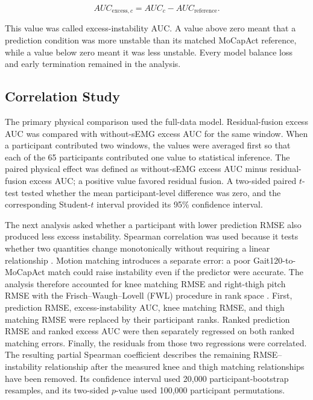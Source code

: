 \documentclass[referee,lineno,pdflatex,sn-vancouver-num]{sn-jnl}
\begin{document}
\begin{equation}
AUC_{\mathrm{excess},c}=AUC_c-AUC_{\mathrm{reference}}.
\end{equation}

This value was called excess-instability AUC. A value above zero meant that a prediction condition was more unstable than its matched MoCapAct reference, while a value below zero meant it was less unstable. Every model balance loss and early termination remained in the analysis.

\subsection{Correlation Study}

The primary physical comparison used the full-data model. Residual-fusion excess AUC was compared with without-sEMG excess AUC for the same window. When a participant contributed two windows, the values were averaged first so that each of the 65 participants contributed one value to statistical inference. The paired physical effect was defined as without-sEMG excess AUC minus residual-fusion excess AUC; a positive value favored residual fusion. A two-sided paired $t$-test tested whether the mean participant-level difference was zero, and the corresponding Student-$t$ interval provided its 95\% confidence interval.

The next analysis asked whether a participant with lower prediction RMSE also produced less excess instability. Spearman correlation was used because it tests whether two quantities change monotonically without requiring a linear relationship \cite{spearman1904}. Motion matching introduces a separate error: a poor Gait120-to-MoCapAct match could raise instability even if the predictor were accurate. The analysis therefore accounted for knee matching RMSE and right-thigh pitch RMSE with the Frisch--Waugh--Lovell (FWL) procedure in rank space \cite{frisch1933,lovell1963}. First, prediction RMSE, excess-instability AUC, knee matching RMSE, and thigh matching RMSE were replaced by their participant ranks. Ranked prediction RMSE and ranked excess AUC were then separately regressed on both ranked matching errors. Finally, the residuals from those two regressions were correlated. The resulting partial Spearman coefficient describes the remaining RMSE--instability relationship after the measured knee and thigh matching relationships have been removed. Its confidence interval used 20,000 participant-bootstrap resamples, and its two-sided $p$-value used 100,000 participant permutations.
\end{document}
